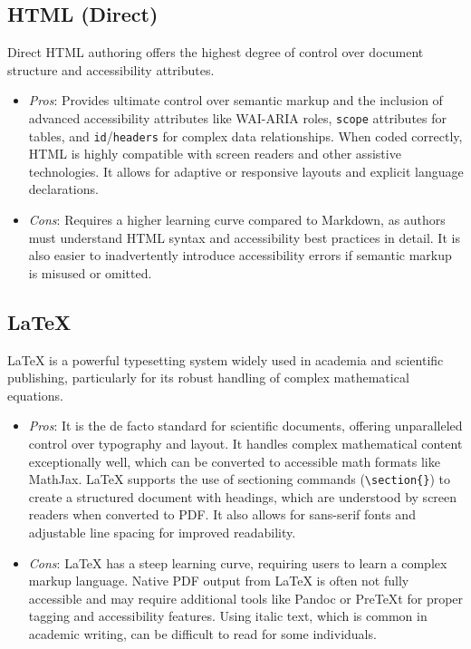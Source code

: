 \subsection{HTML (Direct)}
Direct HTML authoring offers the highest degree of control over document structure and accessibility attributes.
\begin{itemize}
    \item \emph{Pros}: Provides ultimate control over semantic markup and the inclusion of advanced accessibility attributes like WAI-ARIA roles, \texttt{scope} attributes for tables, and \texttt{id}/\texttt{headers} for complex data relationships. \cite{MDNHTML, UniversalDesign, MDNTableAccess} When coded correctly, HTML is highly compatible with screen readers and other assistive technologies. \cite{ReciteMe} It allows for adaptive or responsive layouts and explicit language declarations. \cite{UniversalDesign, QuartoCommonMark}
    \item \emph{Cons}: Requires a higher learning curve compared to Markdown, as authors must understand HTML syntax and accessibility best practices in detail. \cite{UniversalDesign} It is also easier to inadvertently introduce accessibility errors if semantic markup is misused or omitted. \cite{UniversalDesign}
\end{itemize}

\subsection{LaTeX}
LaTeX is a powerful typesetting system widely used in academia and scientific publishing, particularly for its robust handling of complex mathematical equations. \cite{CreateUW}
\begin{itemize}
    \item \emph{Pros}: It is the de facto standard for scientific documents, offering unparalleled control over typography and layout. It handles complex mathematical content exceptionally well, which can be converted to accessible math formats like MathJax. \cite{CreateUW, LaTeXAccessibility} LaTeX supports the use of sectioning commands (\texttt{\textbackslash section\{\}}) to create a structured document with headings, which are understood by screen readers when converted to PDF. \cite{LancasterLatex} It also allows for sans-serif fonts and adjustable line spacing for improved readability. \cite{LancasterLatex}
    \item \emph{Cons}: LaTeX has a steep learning curve, requiring users to learn a complex markup language. Native PDF output from LaTeX is often not fully accessible and may require additional tools like Pandoc or PreTeXt for proper tagging and accessibility features. \cite{CreateUW, LaTeXAccessibility} Using italic text, which is common in academic writing, can be difficult to read for some individuals. \cite{LancasterLatex}
\end{itemize}

